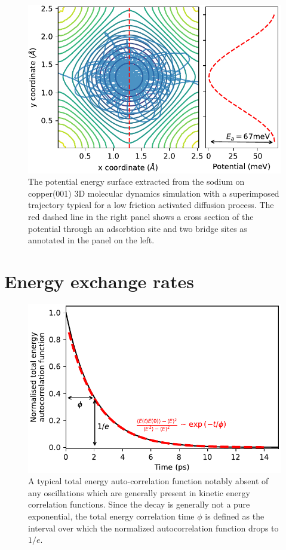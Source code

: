 \documentclass[7pt]{article}
\begin{document}
\begin{figure}
	\centering
	\includegraphics[width=1.0\columnwidth]{pot_surface}
	\caption{The potential energy surface extracted from the sodium on copper(001) 3D molecular dynamics simulation with a superimposed trajectory typical for a low friction activated diffusion process. The red dashed line in the right panel shows a cross section of the potential through an adsorbtion site and two bridge sites as annotated in the panel on the left.}
	\label{pot_surface}
\end{figure}

\section*{Energy exchange rates}

\begin{figure}
	\centering
	\includegraphics[width=1.0\columnwidth]{e_auto}
	\caption{A typical total energy auto-correlation function notably absent of any oscillations which are generally present in kinetic energy correlation functions. Since the decay is generally not a pure exponential, the total energy correlation time $\phi$ is defined as the interval over which the normalized autocorrelation function drops to $1/e$.}
	\label{fig:e_auto}
\end{figure}
\end{document}
